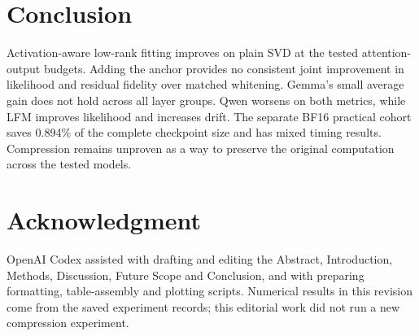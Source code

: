\documentclass[conference]{IEEEtran}
\begin{document}
\section{Conclusion}
Activation-aware low-rank fitting improves on plain SVD at the tested attention-output budgets. Adding the anchor provides no consistent joint improvement in likelihood and residual fidelity over matched whitening. Gemma's small average gain does not hold across all layer groups. Qwen worsens on both metrics, while LFM improves likelihood and increases drift. The separate BF16 practical cohort saves 0.894\% of the complete checkpoint size and has mixed timing results. Compression remains unproven as a way to preserve the original computation across the tested models.\par\smallskip
\section*{Acknowledgment}
OpenAI Codex \cite{openaicodex2026} assisted with drafting and editing the Abstract, Introduction, Methods, Discussion, Future Scope and Conclusion, and with preparing formatting, table-assembly and plotting scripts. Numerical results in this revision come from the saved experiment records; this editorial work did not run a new compression experiment.\par\smallskip
\end{document}
